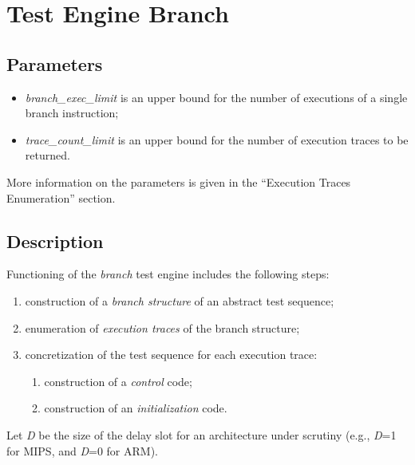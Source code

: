 \documentclass[oneside,final,12pt]{extreport}
\begin{document}

\chapter{Test Engine Branch}

\section{Parameters}

\begin{itemize}
\item \emph{branch{\_}exec{\_}limit} is an upper bound for the number of executions of a single branch instruction;
\item \emph{trace{\_}count{\_}limit} is an upper bound for the number of execution traces to be returned.
\end{itemize}

More information on the parameters is given in the “Execution Traces Enumeration” section.

\section{Description}

Functioning of the \emph{branch} test engine includes the following steps:

\begin{enumerate}
  \item construction of a \emph{branch structure} of an abstract test sequence;
  \item enumeration of \emph{execution traces} of the branch structure;
  \item concretization of the test sequence for each execution trace:
  \begin{enumerate}
    \item construction of a \emph{control} code;
    \item construction of an \emph{initialization} code.
  \end{enumerate}
\end{enumerate}

Let \emph{D} be the size of the delay slot for an architecture under scrutiny (e.g., \emph{D}=1
for MIPS, and \emph{D}=0 for ARM).

\end{document}
